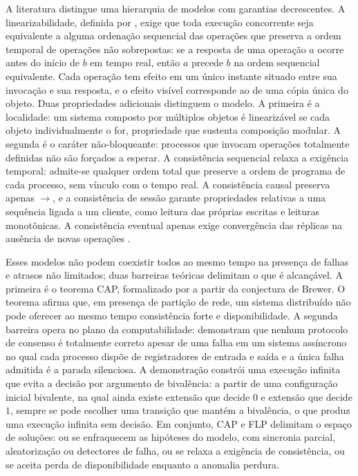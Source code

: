 A literatura distingue uma hierarquia de modelos com garantias decrescentes. A linearizabilidade, definida por \citet{herlihy_wing_linearizability_1990}, exige que toda execução concorrente seja equivalente a alguma ordenação sequencial das operações que preserva a ordem temporal de operações não sobrepostas: se a resposta de uma operação $a$ ocorre antes do início de $b$ em tempo real, então $a$ precede $b$ na ordem sequencial equivalente. Cada operação tem efeito em um único instante situado entre sua invocação e sua resposta, e o efeito visível corresponde ao de uma cópia única do objeto. Duas propriedades adicionais distinguem o modelo. A primeira é a localidade: um sistema composto por múltiplos objetos é linearizável se cada objeto individualmente o for, propriedade que sustenta composição modular. A segunda é o caráter não-bloqueante: processos que invocam operações totalmente definidas não são forçados a esperar. A consistência sequencial relaxa a exigência temporal: admite-se qualquer ordem total que preserve a ordem de programa de cada processo, sem vínculo com o tempo real. A consistência causal preserva apenas $\to$, e a consistência de sessão garante propriedades relativas a uma sequência ligada a um cliente, como leitura das próprias escritas e leituras monotônicas. A consistência eventual apenas exige convergência das réplicas na ausência de novas operações \citep{ruizfuertes_consistency_2012, liu_quantitative_consistency_2015}.

Esses modelos não podem coexistir todos ao mesmo tempo na presença de falhas e atrasos não limitados; duas barreiras teóricas delimitam o que é alcançável. A primeira é o teorema CAP, formalizado por \citet{gilbert_lynch_cap_2002} a partir da conjectura de Brewer. O teorema afirma que, em presença de partição de rede, um sistema distribuído não pode oferecer ao mesmo tempo consistência forte e disponibilidade. A segunda barreira opera no plano da computabilidade: \citet{fischer_lynch_paterson_flp_1985} demonstram que nenhum protocolo de consenso é totalmente correto apesar de uma falha em um sistema assíncrono no qual cada processo dispõe de registradores de entrada e saída e a única falha admitida é a parada silenciosa. A demonstração constrói uma execução infinita que evita a decisão por argumento de bivalência: a partir de uma configuração inicial bivalente, na qual ainda existe extensão que decide $0$ e extensão que decide $1$, sempre se pode escolher uma transição que mantém a bivalência, o que produz uma execução infinita sem decisão. Em conjunto, CAP e FLP delimitam o espaço de soluções: ou se enfraquecem as hipóteses do modelo, com sincronia parcial, aleatorização ou detectores de falha, ou se relaxa a exigência de consistência, ou se aceita perda de disponibilidade enquanto a anomalia perdura.


